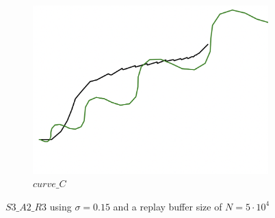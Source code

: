 \begin{figure}[H]
\begin{subfigure}[b]{0.31\textwidth}
         \includegraphics[width=\textwidth]{images/ddpg_results/envs_S3_S4_S5/S3_A2_R3_curve_C.png}
         \caption{$curve\_C$}
     \end{subfigure}
        \caption{$S3\_A2\_R3$ using $\sigma=0.15$ and a replay buffer size of $N=5\cdot 10^4$}
        \label{fig:advCurves2}
\end{figure}



